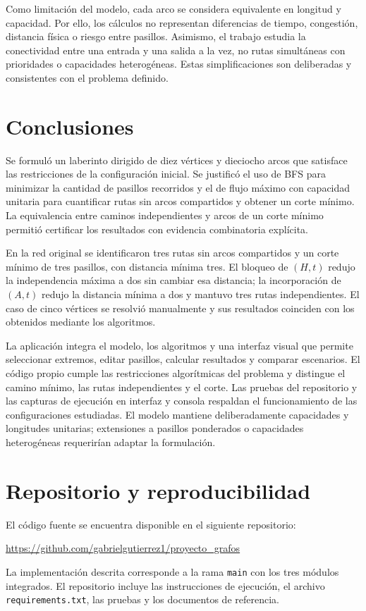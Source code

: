 \documentclass[11pt,a4paper]{article}
\begin{document}
Como limitación del modelo, cada arco se considera equivalente en longitud y capacidad. Por ello, los cálculos no representan diferencias de tiempo, congestión, distancia física o riesgo entre pasillos. Asimismo, el trabajo estudia la conectividad entre una entrada y una salida a la vez, no rutas simultáneas con prioridades o capacidades heterogéneas. Estas simplificaciones son deliberadas y consistentes con el problema definido.

\section{Conclusiones}
Se formuló un laberinto dirigido de diez vértices y dieciocho arcos que satisface las restricciones de la configuración inicial. Se justificó el uso de BFS para minimizar la cantidad de pasillos recorridos y el de flujo máximo con capacidad unitaria para cuantificar rutas sin arcos compartidos y obtener un corte mínimo. La equivalencia entre caminos independientes y arcos de un corte mínimo permitió certificar los resultados con evidencia combinatoria explícita.

En la red original se identificaron tres rutas sin arcos compartidos y un corte mínimo de tres pasillos, con distancia mínima tres. El bloqueo de $(H,t)$ redujo la independencia máxima a dos sin cambiar esa distancia; la incorporación de $(A,t)$ redujo la distancia mínima a dos y mantuvo tres rutas independientes. El caso de cinco vértices se resolvió manualmente y sus resultados coinciden con los obtenidos mediante los algoritmos.

La aplicación integra el modelo, los algoritmos y una interfaz visual que permite seleccionar extremos, editar pasillos, calcular resultados y comparar escenarios. El código propio cumple las restricciones algorítmicas del problema y distingue el camino mínimo, las rutas independientes y el corte. Las pruebas del repositorio y las capturas de ejecución en interfaz y consola respaldan el funcionamiento de las configuraciones estudiadas. El modelo mantiene deliberadamente capacidades y longitudes unitarias; extensiones a pasillos ponderados o capacidades heterogéneas requerirían adaptar la formulación.

\clearpage
\section{Repositorio y reproducibilidad}
El código fuente se encuentra disponible en el siguiente repositorio:\par
\url{https://github.com/gabrielgutierrez1/proyecto_grafos}\par
La implementación descrita corresponde a la rama \texttt{main} con los tres módulos integrados. El repositorio incluye las instrucciones de ejecución, el archivo \texttt{requirements.txt}, las pruebas y los documentos de referencia.
\end{document}
